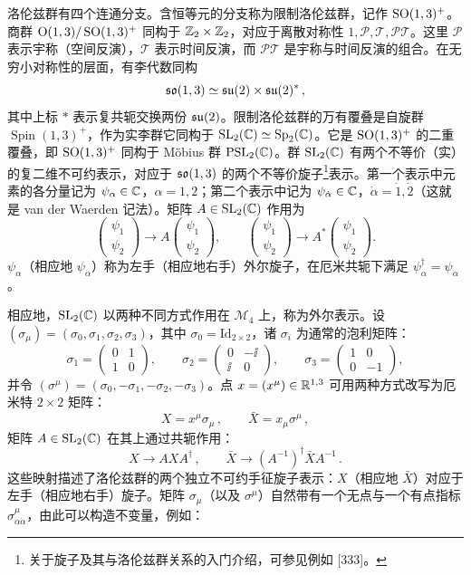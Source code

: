 洛伦兹群有四个连通分支。含恒等元的分支称为限制洛伦兹群，记作 $\operatorname{SO}(1,3)^+$。商群 $\mathrm{O}(1,3)/\operatorname{SO}(1,3)^+$ 同构于 $\mathbb{Z}_2\times\mathbb{Z}_2$，对应于离散对称性 $1,\mathcal{P},\mathcal{T},\mathcal{PT}$。这里 $\mathcal{P}$ 表示宇称（空间反演），$\mathcal{T}$ 表示时间反演，而 $\mathcal{PT}$ 是宇称与时间反演的组合。在无穷小对称性的层面，有李代数同构
\[
\mathfrak{so}(1,3)\simeq\mathfrak{su}(2)\times\mathfrak{su}(2)^*\,,
\]
其中上标 $*$ 表示复共轭交换两份 $\mathfrak{su}(2)$。限制洛伦兹群的万有覆叠是自旋群 $\operatorname{Spin}(1,3)^+$，作为实李群它同构于 $\operatorname{SL}_2(\mathbb{C})\simeq\operatorname{Sp}_2(\mathbb{C})$。它是 $\operatorname{SO}(1,3)^+$ 的二重覆叠，即 $\operatorname{SO}(1,3)^+$ 同构于 Möbius 群 $\operatorname{PSL}_2(\mathbb{C})$。群 $\operatorname{SL}_2(\mathbb{C})$ 有两个不等价（实）的复二维不可约表示，对应于 $\mathfrak{so}(1,3)$ 的两个不等价旋子\footnote{关于旋子及其与洛伦兹群关系的入门介绍，可参见例如 [333]。}表示。第一个表示中元素的各分量记为 $\psi_\alpha\in\mathbb{C}$，$\alpha=1,2$；第二个表示中记为 $\psi_{\dot\alpha}\in\mathbb{C}$，$\dot\alpha=\dot 1,\dot 2$（这就是 van der Waerden 记法）。矩阵 $A\in\operatorname{SL}_2(\mathbb{C})$ 作用为
\[
\begin{pmatrix}\psi_1\\ \psi_2\end{pmatrix}\to A\begin{pmatrix}\psi_1\\ \psi_2\end{pmatrix},\qquad
\begin{pmatrix}\psi_{\dot 1}\\ \psi_{\dot 2}\end{pmatrix}\to A^*\begin{pmatrix}\psi_{\dot 1}\\ \psi_{\dot 2}\end{pmatrix}.
\]
$\psi_\alpha$（相应地 $\psi_{\dot\alpha}$）称为左手（相应地右手）外尔旋子，在厄米共轭下满足 $\psi_\alpha^\dagger=\psi_{\dot\alpha}$。

相应地，$\operatorname{SL}_2(\mathbb{C})$ 以两种不同方式作用在 $\mathcal{M}_4$ 上，称为外尔表示。设 $(\sigma_\mu)=(\sigma_0,\sigma_1,\sigma_2,\sigma_3)$，其中 $\sigma_0=\mathrm{Id}_{2\times 2}$，诸 $\sigma_i$ 为通常的泡利矩阵：
\[
\sigma_1=\begin{pmatrix}0&1\\ 1&0\end{pmatrix},\qquad
\sigma_2=\begin{pmatrix}0&-\ii\\ \ii&0\end{pmatrix},\qquad
\sigma_3=\begin{pmatrix}1&0\\ 0&-1\end{pmatrix},
\]
并令 $(\sigma^\mu)=(\sigma_0,-\sigma_1,-\sigma_2,-\sigma_3)$。点 $x=(x^\mu)\in\mathbb{R}^{1,3}$ 可用两种方式改写为厄米特 $2\times 2$ 矩阵：
\[
X=x^\mu\sigma_\mu\,,\qquad \bar X=x_\mu\sigma^\mu\,,
\]
矩阵 $A\in\operatorname{SL}_2(\mathbb{C})$ 在其上通过共轭作用：
\[
X\to AXA^\dagger\,,\qquad \bar X\to (A^{-1})^\dagger\bar XA^{-1}\,.
\]
这些映射描述了洛伦兹群的两个独立不可约手征旋子表示：$X$（相应地 $\bar X$）对应于左手（相应地右手）旋子。矩阵 $\sigma_\mu$（以及 $\sigma^\mu$）自然带有一个无点与一个有点指标 $\sigma^\mu_{\alpha\dot\alpha}$，由此可以构造不变量，例如：

